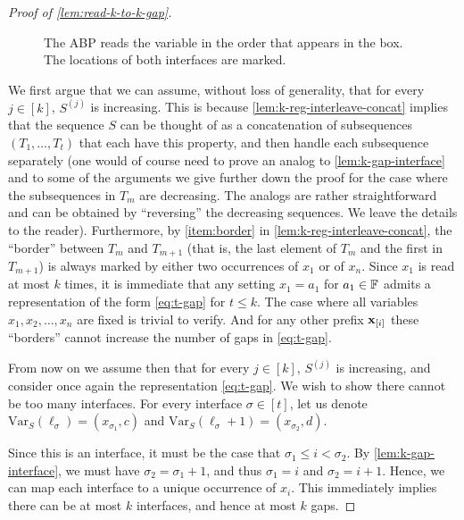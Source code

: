 \documentclass[11pt]{article}
\newcommand{\var}[2]{\mathrm{Var}_{#1}({#2})}
\newcommand{\exi}{\vecx_{[i]}}
\begin{document}
\begin{proof}[Proof of \autoref{lem:read-k-to-k-gap}]
\begin{figure}[h]
\begin{center}
\caption{The ABP reads the variable in the order that appears in the box. The locations of both interfaces are marked.}
\label{fig:interface}
\end{center}
\end{figure}


We first argue that we can assume, without loss of generality, that for every $j \in [k]$, $S^{(j)}$ is increasing. This is because \autoref{lem:k-reg-interleave-concat} implies that 
the sequence $S$ can be thought of as a concatenation of subsequences $(T_1, \ldots , T_t)$ that each have this property, and then handle each subsequence separately (one would of course need to prove an analog to \autoref{lem:k-gap-interface} and to some of the arguments we give further down the proof for the case where the subsequences in $T_m$ are decreasing. The analogs are rather straightforward and can be obtained by ``reversing'' the decreasing sequences. We leave the details to the reader). Furthermore, by \autoref{item:border} in \autoref{lem:k-reg-interleave-concat}, the ``border'' between $T_m$ and $T_{m+1}$ (that is, the last element of $T_m$ and the first in $T_{m+1}$) is always marked by either two occurrences of $x_1$ or of $x_n$.  Since $x_1$ is read at most $k$ times, it is immediate that any setting $x_1=a_1$ for $a_1 \in \F$ admits a representation of the form \eqref{eq:t-gap} for $t \le k$. The case where all variables $x_1, x_2, \ldots, x_n$ are fixed is trivial to verify. And for any other prefix $\exi$ these ``borders'' cannot increase the number of gaps in \eqref{eq:t-gap}.

From now on we assume then that for every $j \in [k]$, $S^{(j)}$ is increasing, and consider once again the representation \eqref{eq:t-gap}. We wish to show there cannot be too many interfaces. For every interface $\sigma \in [t]$, let us denote $\var{S}{\ell_\sigma} = (x_{\sigma_1}, c)$ and $\var{S}{\ell_\sigma+1} = (x_{\sigma_2}, d)$.

Since this is an interface, it must be the case that $\sigma_1 \le i < \sigma_2$. By \autoref{lem:k-gap-interface}, we must have $\sigma_2=\sigma_1+1$, and thus $\sigma_1 = i$ and $\sigma_2=i+1$. Hence, we can map each interface to a unique occurrence of $x_i$. This immediately implies there can be at most $k$ interfaces, and hence at most $k$ gaps.
\end{proof}
\end{document}
